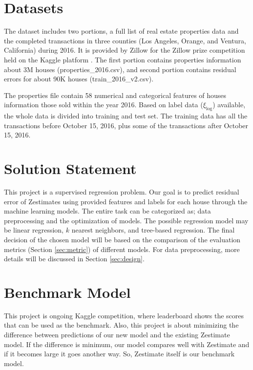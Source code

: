 \documentclass[12pt]{article}
\begin{document}
\section{Datasets}\label{sec:dataset}
The dataset includes two portions, a full list of real estate properties data and the completed transactions in three counties (Los Angeles, Orange, and Ventura, California) during 2016. It is provided by Zillow for the Zillow prize competition held on the Kaggle platform \cite{kaggle}. The first portion contains properties information about 3M houses (properties\_2016.csv), and second portion contains residual errors for about 90K houses (train\_2016\_v2.csv).

The properties file contain 58 numerical and categorical features of houses information those sold within the year 2016. Based on label data ($\xi_{\log}$) available, the whole data is divided into training and test set. The training data has all the transactions before October 15, 2016, plus some of the transactions after October 15, 2016.

\section{Solution Statement}\label{sec:solutionstate}
This project is a supervised regression problem. Our goal is to predict residual error of Zestimates using provided features and labels for each house through the machine learning models. The entire task can be categorized as; data preprocessing and the optimization of models. The possible regression model may be linear regression, $k$ nearest neighbors, and tree-based regression. The final decision of the chosen model will be based on the comparison of the evaluation metrics (Section \ref{sec:metric}) of different models. For data preprocessing, more details will be discussed in Section \ref{sec:design}.


\section{Benchmark Model}\label{sec:benchmark}
This project is ongoing Kaggle competition, where leaderboard shows the scores that can be used as the benchmark. Also, this project is about minimizing the difference between predictions of our new model and the existing Zestimate model. If the difference is minimum, our model compares well with Zestimate and if it becomes large it goes another way. So, Zestimate itself is our benchmark model. 
\end{document}
